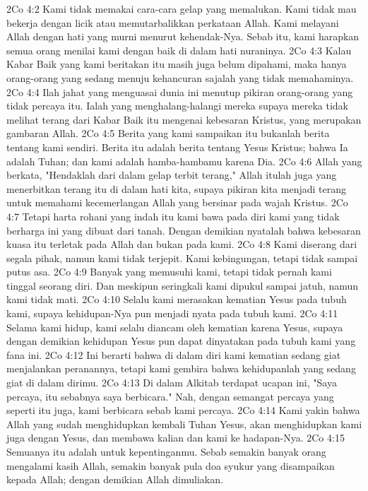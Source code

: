 2Co 4:2  Kami tidak memakai cara-cara gelap yang memalukan. Kami tidak mau bekerja dengan licik atau memutarbalikkan perkataan Allah. Kami melayani Allah dengan hati yang murni menurut kehendak-Nya. Sebab itu, kami harapkan semua orang menilai kami dengan baik di dalam hati nuraninya.
2Co 4:3  Kalau Kabar Baik yang kami beritakan itu masih juga belum dipahami, maka hanya orang-orang yang sedang menuju kehancuran sajalah yang tidak memahaminya.
2Co 4:4  Ilah jahat yang menguasai dunia ini menutup pikiran orang-orang yang tidak percaya itu. Ialah yang menghalang-halangi mereka supaya mereka tidak melihat terang dari Kabar Baik itu mengenai kebesaran Kristus, yang merupakan gambaran Allah.
2Co 4:5  Berita yang kami sampaikan itu bukanlah berita tentang kami sendiri. Berita itu adalah berita tentang Yesus Kristus; bahwa Ia adalah Tuhan; dan kami adalah hamba-hambamu karena Dia.
2Co 4:6  Allah yang berkata, "Hendaklah dari dalam gelap terbit terang," Allah itulah juga yang menerbitkan terang itu di dalam hati kita, supaya pikiran kita menjadi terang untuk memahami kecemerlangan Allah yang bersinar pada wajah Kristus.
2Co 4:7  Tetapi harta rohani yang indah itu kami bawa pada diri kami yang tidak berharga ini yang dibuat dari tanah. Dengan demikian nyatalah bahwa kebesaran kuasa itu terletak pada Allah dan bukan pada kami.
2Co 4:8  Kami diserang dari segala pihak, namun kami tidak terjepit. Kami kebingungan, tetapi tidak sampai putus asa.
2Co 4:9  Banyak yang memusuhi kami, tetapi tidak pernah kami tinggal seorang diri. Dan meskipun seringkali kami dipukul sampai jatuh, namun kami tidak mati.
2Co 4:10  Selalu kami merasakan kematian Yesus pada tubuh kami, supaya kehidupan-Nya pun menjadi nyata pada tubuh kami.
2Co 4:11  Selama kami hidup, kami selalu diancam oleh kematian karena Yesus, supaya dengan demikian kehidupan Yesus pun dapat dinyatakan pada tubuh kami yang fana ini.
2Co 4:12  Ini berarti bahwa di dalam diri kami kematian sedang giat menjalankan peranannya, tetapi kami gembira bahwa kehidupanlah yang sedang giat di dalam dirimu.
2Co 4:13  Di dalam Alkitab terdapat ucapan ini, "Saya percaya, itu sebabnya saya berbicara." Nah, dengan semangat percaya yang seperti itu juga, kami berbicara sebab kami percaya.
2Co 4:14  Kami yakin bahwa Allah yang sudah menghidupkan kembali Tuhan Yesus, akan menghidupkan kami juga dengan Yesus, dan membawa kalian dan kami ke hadapan-Nya.
2Co 4:15  Semuanya itu adalah untuk kepentinganmu. Sebab semakin banyak orang mengalami kasih Allah, semakin banyak pula doa syukur yang disampaikan kepada Allah; dengan demikian Allah dimuliakan.
